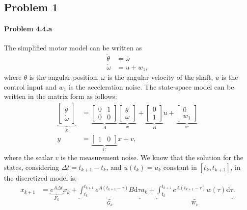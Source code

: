 \subsection*{Problem 1}
\paragraph{Problem 4.4.a}The simplified motor model can be written as
\begin{align*}
	\dot{\theta} &= \omega\\
	\dot{\omega} &= u+w_1,
\end{align*}
where $\theta$ is the angular position, $\omega$ is the angular velocity of the shaft, $u$ is the control input and $w_1$ is the acceleration noise. The state-space model can be written in the matrix form as follows:
\begin{align}\label{eq:q1_ss_model}
	\underbrace{\begin{bmatrix}\dot{\theta}\\\dot{\omega}\end{bmatrix}}_{\dot{x}} &= \underbrace{\begin{bmatrix}0 & 1\\0 & 0\end{bmatrix}}_{A}\underbrace{\begin{bmatrix}\theta\\\omega\end{bmatrix}}_{x}+\underbrace{\begin{bmatrix}0\\1\end{bmatrix}}_{B}u+\underbrace{\begin{bmatrix}0\\w_1\end{bmatrix}}_{w}\nonumber\\
	y &= \underbrace{\begin{bmatrix}1 & 0\end{bmatrix}}_{C}x+v,
\end{align}
where the scalar $v$ is the measurement noise. We know that the solution for the states, considering $\Delta t = t_{k+1}-t_k$, and $u(t_k)=u_k$ constant in $[t_k, t_{k+1}]$, in the discretized model is:
\begin{align*}
	x_{k+1} &= \underbrace{e^{A\Delta t}}_{F_{k}}x_{k} + \underbrace{\int_{t_{k}}^{t_{k+1}} e^{A(t_{k+1}-\tau)}B\text{d}\tau}_{G_k}u_k+\underbrace{\int_{t_k}^{t_{k+1}}e^{A(t_{k+1}-\tau)}w(\tau)\text{d}\tau}_{W_k}.
\end{align*}
